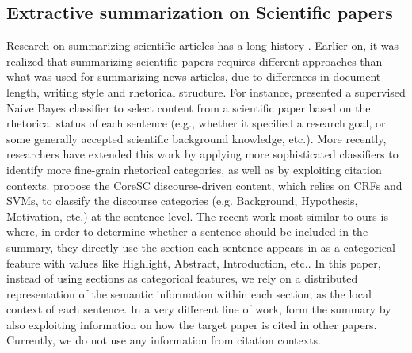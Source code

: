 \subsection{Extractive summarization on Scientific papers}
Research on summarizing scientific articles has a long history \cite{survey_summarization}. Earlier on, it was realized   that summarizing scientific papers requires different approaches than what was used for summarizing news articles, due to differences in document length, writing style and rhetorical structure. For instance, \cite{scientific_article_summarization_02} presented a supervised Naive Bayes classifier to select content from a scientific paper based on the rhetorical status of each sentence (e.g., whether it specified a research goal, or some generally accepted scientific background knowledge, etc.). 
More recently, researchers have extended this work by applying more sophisticated classifiers to identify more fine-grain rhetorical categories, as well as by exploiting citation contexts.  propose the CoreSC discourse-driven content, which relies on CRFs and SVMs, to classify the discourse categories (e.g. Background, Hypothesis, Motivation, etc.) at the sentence level.  The recent work most similar to ours is \cite{section_supervised} where, in order to determine whether a sentence should be included in the summary, they directly use the section  each sentence appears in as a categorical feature with  values like Highlight, Abstract, Introduction, etc.. In this paper, instead of using sections as categorical features, we rely on a distributed representation of the semantic information within each section, as the local context of each sentence. In a very different line of work,  form the summary  by also exploiting information on how the target paper is cited in  other papers. Currently, we do not use any information from citation contexts.

